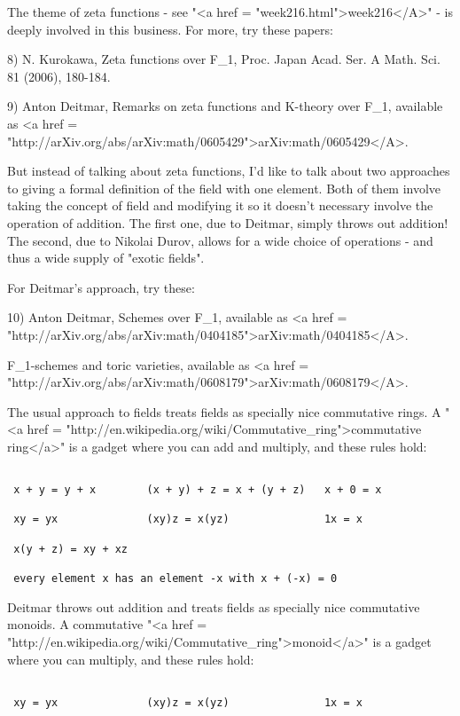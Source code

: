 The theme of zeta functions - see "<a href =
"week216.html">week216</A>" - is deeply involved in this
business.  For more, try these papers:

8) N. Kurokawa, Zeta functions over F_{1}, Proc. Japan Acad. Ser. A
Math. Sci. 81 (2006), 180-184.

9) Anton Deitmar, Remarks on zeta functions and K-theory over F_{1},
available as <a href =
"http://arXiv.org/abs/arXiv:math/0605429">arXiv:math/0605429</A>.
 
But instead of talking about zeta functions, I'd like to talk about
two approaches to giving a formal definition of the field with one
element.  Both of them involve taking the concept of field and 
modifying it so it doesn't necessary involve the operation of addition.
The first one, due to Deitmar, simply throws out addition!  The second,
due to Nikolai Durov, allows for a wide choice of operations - and thus
a wide supply of "exotic fields".

For Deitmar's approach, try these:

10) Anton Deitmar, Schemes over F_{1}, available as <a href = "http://arXiv.org/abs/arXiv:math/0404185">arXiv:math/0404185</A>.

F_{1}-schemes and toric varieties, available as <a href = "http://arXiv.org/abs/arXiv:math/0608179">arXiv:math/0608179</A>.

The usual approach to fields treats fields as specially nice
commutative rings.  A "<a href =
"http://en.wikipedia.org/wiki/Commutative_ring">commutative
ring</a>" is a gadget where you can add and multiply, and these
rules hold:


\begin{verbatim}

 x + y = y + x        (x + y) + z = x + (y + z)   x + 0 = x

 xy = yx              (xy)z = x(yz)               1x = x

 x(y + z) = xy + xz 

 every element x has an element -x with x + (-x) = 0
\end{verbatim}
    

Deitmar throws out addition and treats fields as specially nice
commutative monoids.  A commutative "<a href =
"http://en.wikipedia.org/wiki/Commutative_ring">monoid</a>" is a gadget where you can multiply, and these rules
hold:


\begin{verbatim}

 xy = yx              (xy)z = x(yz)               1x = x
\end{verbatim}
    

